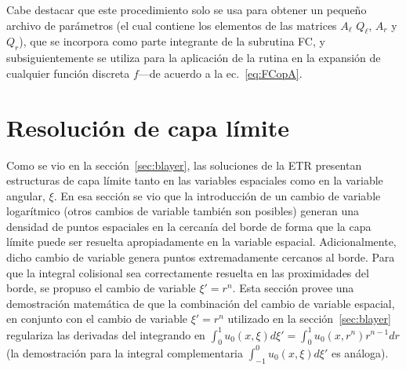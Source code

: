 Cabe destacar que este procedimiento  solo se usa para obtener un pequeño archivo de parámetros 
(el cual contiene los elementos de las matrices $A_{\ell}$ $Q_{\ell}$, $A_{r}$ y $Q_{r}$), que se incorpora como parte integrante de la subrutina FC, y subsiguientemente se utiliza para la aplicación de la rutina en la expansión de cualquier función discreta $f$---de acuerdo a la ec.~\eqref{eq:FCopA}.  

\chapter{Resolución de capa límite}
\label{ap:demcv}
Como se vio en la sección~\ref{sec:blayer}, las soluciones de la ETR presentan 
estructuras de capa límite tanto en las variables espaciales como en la variable angular, $\xi$. 
En esa sección se vio que la introducción de un cambio de variable logarítmico (otros cambios 
de variable también son posibles) generan una densidad de puntos espaciales en la cercanía 
del borde de forma que la capa límite puede ser resuelta apropiadamente en 
la variable espacial. Adicionalmente, dicho cambio 
de variable genera puntos extremadamente cercanos al borde. Para que la integral colisional sea correctamente 
resuelta en las proximidades del borde, se propuso el cambio de variable $\xi'=r^n$. 
Esta sección provee una demostración matemática de que la combinación del cambio 
de variable espacial, en conjunto con el cambio de variable $\xi'=r^n$ utilizado 
en la sección~\ref{sec:blayer} regulariza las derivadas 
del integrando en $\int_0^1 u_0(x,\xi)d\xi' = \int_0^1  u_0(x,r^n) r^{n-1} dr$ (la demostración 
para la integral complementaria  $\int_{-1}^0 u_0(x,\xi)d\xi'$ es análoga). 


